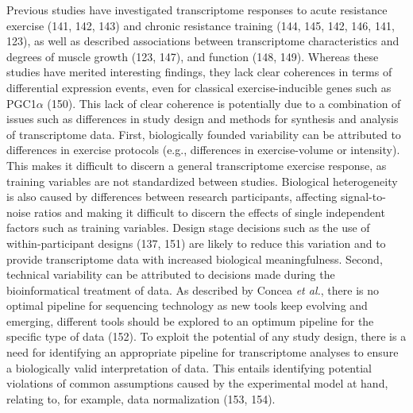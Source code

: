 \documentclass[twoside,10pt]{gihclass} %
\begin{document}
Previous studies have investigated transcriptome responses to acute resistance exercise (141, 142, 143)
and chronic resistance training (144, 145, 142, 146, 141, 123),
as well as described associations between transcriptome characteristics and degrees of muscle growth (123, 147),
and function (148, 149).
Whereas these studies have merited interesting findings, they lack clear coherences in terms of differential expression events, even for classical exercise-inducible genes such as PGC1\(\alpha\) (150).
This lack of clear coherence is potentially due to a combination of issues such as differences in study design and methods for synthesis and analysis of transcriptome data. First, biologically founded variability can be attributed to differences in exercise protocols (e.g., differences in exercise-volume or intensity). This makes it difficult to discern a general transcriptome exercise response, as training variables are not standardized between studies. Biological heterogeneity is also caused by differences between research participants, affecting signal-to-noise ratios and making it difficult to discern the effects of single independent factors such as training variables. Design stage decisions such as the use of within-participant designs (137, 151) are likely to reduce this variation and to provide transcriptome data with increased biological meaningfulness. Second, technical variability can be attributed to decisions made during the bioinformatical treatment of data. As described by Concea \emph{et al.}, there is no optimal pipeline for sequencing technology as new tools keep evolving and emerging, different tools should be explored to an optimum pipeline for the specific type of data (152).
To exploit the potential of any study design, there is a need for identifying an appropriate pipeline for transcriptome analyses to ensure a biologically valid interpretation of data. This entails identifying potential violations of common assumptions caused by the experimental model at hand, relating to, for example, data normalization (153, 154).
\end{document}
